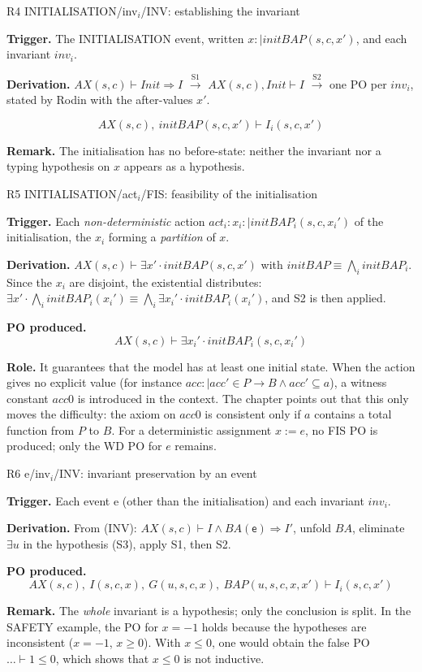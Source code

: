 \documentclass[11pt,a4paper]{article}
\newcommand{\limp}{\Rightarrow}
\newcommand{\BA}{\mathit{BA}}
\newcommand{\AX}{\mathit{AX}(s,c)}
\newcommand{\sff}[1]{\textsf{#1}}
\newcommand{\po}[1]{\textsf{\small #1}}
\newcommand{\champ}[1]{\par\smallskip\noindent\textbf{#1}\enspace}
\begin{document}
\begin{regle}{R4 \quad \po{INITIALISATION/inv$_i$/INV}: establishing the invariant}
  \champ{Trigger.} The \sff{INITIALISATION} event, written
  $x :\mid \mathit{initBAP}(s,c,x')$, and each invariant $inv_i$.
  \champ{Derivation.} $\AX\vdash \mathit{Init}\limp I$ $\xrightarrow{\text{S1}}$
  $\AX,\mathit{Init}\vdash I$ $\xrightarrow{\text{S2}}$ one PO per $inv_i$, stated by
  Rodin with the after-values $x'$.
 
  \[ \AX,\ \mathit{initBAP}(s,c,x') \vdash I_i(s,c,x') \]
  \champ{Remark.} The initialisation has no before-state: neither the invariant nor
  a typing hypothesis on $x$ appears as a hypothesis.
\end{regle}

\begin{regle}{R5 \quad \po{INITIALISATION/act$_i$/FIS}: feasibility of the initialisation}
  \champ{Trigger.} Each \emph{non-deterministic} action
  $act_i : x_i :\mid \mathit{initBAP}_i(s,c,x_i')$ of the initialisation, the $x_i$
  forming a \emph{partition} of $x$.
  \champ{Derivation.} $\AX\vdash\exists x'\cdot\mathit{initBAP}(s,c,x')$ with
  $\mathit{initBAP}\equiv\bigwedge_i\mathit{initBAP}_i$. Since the $x_i$ are
  disjoint, the existential distributes:
  $\exists x'\cdot\bigwedge_i \mathit{initBAP}_i(x_i') \equiv \bigwedge_i \exists x_i'\cdot \mathit{initBAP}_i(x_i')$,
  and S2 is then applied.
  \champ{PO produced.}
  \[ \AX \vdash \exists x_i'\cdot \mathit{initBAP}_i(s,c,x_i') \]
  \champ{Role.} It guarantees that the model has at least one initial state. When
  the action gives no explicit value (for instance
  $acc:\mid acc'\in P\to B\wedge acc'\subseteq a$), a witness constant $acc0$ is
  introduced in the context. The chapter points out that this only moves the
  difficulty: the axiom on $acc0$ is consistent only if $a$ contains a total
  function from $P$ to $B$. For a deterministic assignment $x:=e$, no
  \po{FIS} PO is produced; only the \po{WD} PO for $e$ remains.
\end{regle}

\begin{regle}{R6 \quad \po{e/inv$_i$/INV}: invariant preservation by an event}
  \champ{Trigger.} Each event \sff{e} (other than the initialisation) and each
  invariant $inv_i$.
  \champ{Derivation.} From (INV): $\AX\vdash I\wedge \BA(\sff{e})\limp I'$, unfold
  $\BA$, eliminate $\exists u$ in the hypothesis (S3), apply S1, then S2.
  \champ{PO produced.}
  \[ \AX,\ I(s,c,x),\ G(u,s,c,x),\ \mathit{BAP}(u,s,c,x,x') \vdash I_i(s,c,x') \]
  \champ{Remark.} The \emph{whole} invariant is a hypothesis; only the conclusion is
  split. In the \sff{SAFETY} example, the PO for $x=-1$ holds because the
  hypotheses are inconsistent ($x=-1$, $x\ge 0$). With $x\le 0$, one would obtain
  the false PO $\dots\vdash 1\le 0$, which shows that $x\le 0$ is not inductive.
\end{regle}
\end{document}

